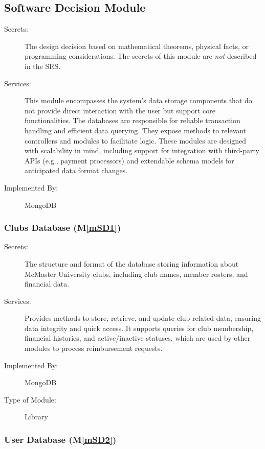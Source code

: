 \documentclass[12pt, titlepage]{article}
\newcommand{\mref}[1]{M\ref{#1}}
\begin{document}
\subsection{Software Decision Module}

\begin{description}
\item[Secrets:] The design decision based on mathematical theorems, physical
  facts, or programming considerations. The secrets of this module are
  \emph{not} described in the SRS.
\item[Services:] This module encompasses the system's data storage components that do not provide direct interaction with the user but support core functionalities. The databases are responsible for reliable transaction handling and efficient data querying. They expose methods to relevant controllers and modules to facilitate logic. These modules are designed with scalability in mind, including support for integration with third-party APIs (e.g., payment processors) and extendable schema models for anticipated data format changes. 
\item[Implemented By:] MongoDB
\end{description}

\subsubsection{Clubs Database (\mref{mSD1})}

\begin{description}
\item[Secrets:] The structure and format of the database storing information about McMaster University clubs, including club names, member rosters, and financial data.
\item[Services:] Provides methods to store, retrieve, and update club-related data, ensuring data integrity and quick access. It supports queries for club membership, financial histories, and active/inactive statuses, which are used by other modules to process reimbursement requests.
\item[Implemented By:] MongoDB
\item[Type of Module:] Library
\end{description}

\subsubsection{User Database (\mref{mSD2})}
\end{document}
